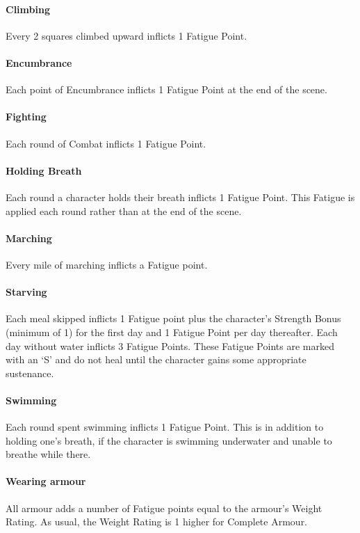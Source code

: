 \documentclass[titlepage,a4paper,openany]{book}
\begin{document}
\begin{multicols}{2}
\paragraph{Climbing} Every 2 squares climbed upward inflicts 1 Fatigue Point.

\paragraph{Encumbrance} Each point of Encumbrance inflicts 1 Fatigue Point at the end of the scene.

\paragraph{Fighting} Each \gls{round} of Combat inflicts 1 Fatigue Point.

\paragraph{Holding Breath} Each \gls{round} a character holds their breath inflicts 1 Fatigue Point. This Fatigue is applied each \gls{round} rather than at the end of the scene.

\paragraph{Marching} Every mile of marching inflicts a Fatigue point.

\paragraph{Starving} Each meal skipped inflicts 1 Fatigue point plus the character's Strength Bonus (minimum of 1) for the first day and 1 Fatigue Point per day thereafter. Each day without water inflicts 3 Fatigue Points. These Fatigue Points are marked with an `S' and do not heal until the character gains some appropriate sustenance.

\paragraph{Swimming} Each \gls{round} spent swimming inflicts 1 Fatigue Point. This is in addition to holding one's breath, if the character is swimming underwater and unable to breathe while there.

\paragraph{Wearing armour} All armour adds a number of Fatigue points equal to the armour's Weight Rating. As usual, the Weight Rating is 1 higher for Complete Armour.


\end{multicols}
\end{document}
